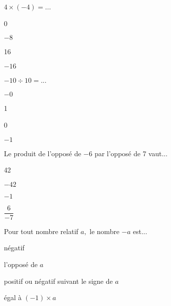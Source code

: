 \begin{QCM}
\begin{GroupeQCM}
\begin{exercice}
$4 \times (-4) =$...
\begin{ChoixQCM}{4}
\item 0
\item $-8$
\item 16
\item $-16$
\end{ChoixQCM}
\begin{corrige}
\end{corrige}
\end{exercice}


\begin{exercice}
$-10 \div 10 =$...
\begin{ChoixQCM}{4}
\item $-0$
\item 1
\item 0
\item $-1$
\end{ChoixQCM}
\begin{corrige}
\end{corrige}
\end{exercice}


\begin{exercice}
Le produit de l'opposé de $-6$ par l'opposé de 7 vaut...
\begin{ChoixQCM}{4}
\item 42
\item $-42$
\item $-1$
\item $\dfrac{6}{-7}$
\end{ChoixQCM}
\begin{corrige}
\end{corrige}
\end{exercice}


\begin{exercice}
Pour tout nombre relatif $a,$ le nombre $-a$ est...
\begin{ChoixQCM}{4}
\item négatif
\item l'opposé de $a$
\item positif ou négatif suivant le signe de $a$
\item égal à $(-1) \times a$
\end{ChoixQCM}
\begin{corrige}
\end{corrige}
\end{exercice}




\end{GroupeQCM}
\end{QCM}
